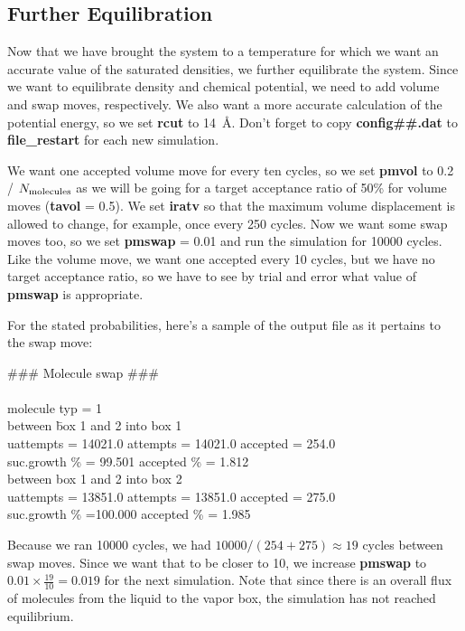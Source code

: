 \documentclass[12pt,letterpaper]{article}
\begin{document}
\subsection{Further Equilibration}
Now that we have brought the system to a temperature for
which we want an accurate value of the saturated densities,
we further equilibrate the system. Since we want to
equilibrate density and chemical potential, we need to add
volume and swap moves, respectively. We also want a more
accurate calculation of the potential energy, so we set {\bf
  rcut} to 14~\AA. Don't forget to copy {\bf config\#\#.dat}
to {\bf file\_restart} for each new simulation.

We want one accepted volume move for every ten cycles, so we
set {\bf pmvol} to 0.2 / $N_{\rm molecules}$ as we will be
going for a target acceptance ratio of 50\% for volume moves
({\bf tavol} = 0.5). We set {\bf iratv} so that the maximum
volume displacement is allowed to change, for example, once
every 250 cycles. Now we want some swap moves too, so we set
{\bf pmswap} = 0.01 and run the simulation for 10000 cycles.
Like the volume move, we want one accepted every 10 cycles,
but we have no target acceptance ratio, so we have to see by
trial and error what value of {\bf pmswap} is appropriate.

For the stated probabilities, here's a sample of the output
file as it pertains to the swap move:

{\bf \begin{tabbing}
\#\#\# Molecule swap \#\#\# \\
\\
 molecule typ = \hskip 24pt 1 \\
between \= box 1 and 2 into box 1\\
   \> uattempts = 14021.0 attempts = 14021.0 accepted = 254.0\\
 suc.growth \% = 99.501   accepted \% = 1.812\\
between box 1 and  2 into box 2\\
   \> uattempts = 13851.0 attempts = 13851.0 accepted = 275.0\\
 suc.growth \% =100.000   accepted \% = 1.985\\
\end{tabbing} }

Because we ran 10000 cycles, we had $10000 / (254 + 275)
\approx 19 $ cycles between swap moves. Since we want that
to be closer to 10, we increase {\bf pmswap} to $0.01 \times
\frac{19}{10} = 0.019$ for the next simulation. Note that
since there is an overall flux of molecules from the liquid
to the vapor box, the simulation has not reached
equilibrium.
\end{document}
